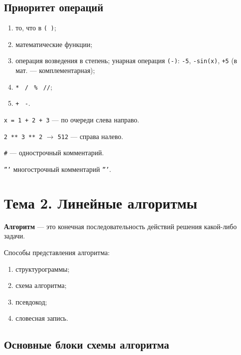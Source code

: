 \documentclass[a4paper, 12pt]{article}
\begin{document}
\subsection*{Приоритет операций}

\begin{enumerate}[noitemsep, label=\arabic*)]
  \item то, что в \texttt{( )};
  \item математические функции;
  \item[3--4)] операция возведения в степень; унарная операция \texttt{(-)}:
    \texttt{-5}, \texttt{-sin(x)}, \texttt{+5} (в мат. --- комплементарная); %
  \item[5)] \texttt{*} \ \texttt{/} \ \texttt{\%} \ \texttt{//};
  \item[6)] \texttt{+} \ \texttt{-}.
\end{enumerate}

\texttt{x = 1 + 2 + 3} --- по очереди слева направо.

\texttt{2 ** 3 ** 2} $\to$ \texttt{512} --- справа налево.

\texttt{\#} --- однострочный комментарий.

\texttt{'''} многострочный комментарий \texttt{'''}.

\section*{Тема 2. Линейные алгоритмы}

\textbf{Алгоритм} --- это конечная последовательность действий решения
какой-либо задачи.

Способы представления алгоритма:
\begin{enumerate}[noitemsep]
  \item структурограммы;
  \item схема алгоритма;
  \item псевдокод;
  \item словесная запись.
\end{enumerate}

\subsection*{Основные блоки схемы алгоритма}
\end{document}
